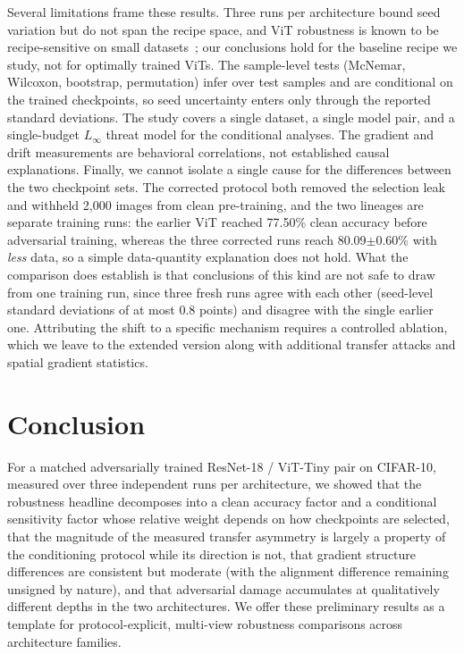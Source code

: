 \documentclass[conference]{IEEEtran}
\begin{document}
Several limitations frame these results. Three runs per architecture bound seed variation but do not span the recipe space, and ViT robustness is known to be recipe-sensitive on small datasets~\cite{mo2022adversarial, debenedetti2023light, wu2025vision}; our conclusions hold for the baseline recipe we study, not for optimally trained ViTs. The sample-level tests (McNemar, Wilcoxon, bootstrap, permutation) infer over test samples and are conditional on the trained checkpoints, so seed uncertainty enters only through the reported standard deviations. The study covers a single dataset, a single model pair, and a single-budget $L_\infty$ threat model for the conditional analyses. The gradient and drift measurements are behavioral correlations, not established causal explanations. Finally, we cannot isolate a single cause for the differences between the two checkpoint sets. The corrected protocol both removed the selection leak and withheld 2{,}000 images from clean pre-training, and the two lineages are separate training runs: the earlier ViT reached 77.50\% clean accuracy before adversarial training, whereas the three corrected runs reach 80.09$\pm$0.60\% with \emph{less} data, so a simple data-quantity explanation does not hold. What the comparison does establish is that conclusions of this kind are not safe to draw from one training run, since three fresh runs agree with each other (seed-level standard deviations of at most 0.8 points) and disagree with the single earlier one. Attributing the shift to a specific mechanism requires a controlled ablation, which we leave to the extended version along with additional transfer attacks and spatial gradient statistics.

\section{Conclusion}
For a matched adversarially trained ResNet-18 / ViT-Tiny pair on CIFAR-10, measured over three independent runs per architecture, we showed that the robustness headline decomposes into a clean accuracy factor and a conditional sensitivity factor whose relative weight depends on how checkpoints are selected, that the magnitude of the measured transfer asymmetry is largely a property of the conditioning protocol while its direction is not, that gradient structure differences are consistent but moderate (with the alignment difference remaining unsigned by nature), and that adversarial damage accumulates at qualitatively different depths in the two architectures. We offer these preliminary results as a template for protocol-explicit, multi-view robustness comparisons across architecture families.



\end{document}

